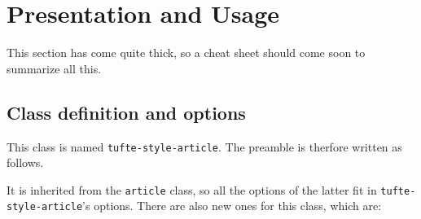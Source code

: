 \documentclass[
	a4paper,
	raggedright,
	twoside,
	12pt,
	colorful,
]{tufte-style-article}
\begin{document}
\section{Presentation and Usage}

This section has come quite thick, so a cheat sheet should come soon to summarize all this.

\subsection{Class definition and options}

This class is named \texttt{tufte-style-article}. The preamble is therfore written as follows.

It is inherited from the \texttt{article} class, so all the options of the latter fit in \texttt{tufte-style-article}'s options. There are also new ones for this class, which are:
\end{document}
